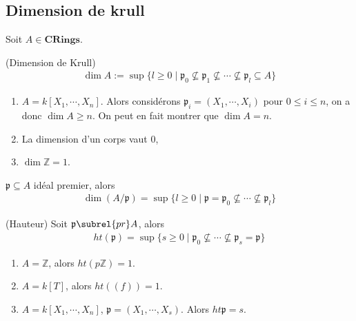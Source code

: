         \subsection{Dimension de krull}
            Soit $A \in \mathbf{CRings}$.
            \begin{defi} (Dimension de Krull)
                \begin{align*}
                    \dim A := \sup \{l \geq 0 \mid \mathfrak{p}_0 \nsubseteq \mathfrak{p}_1 \nsubseteq \cdots \nsubseteq \mathfrak{p}_l \subseteq A\}
                \end{align*}
            \end{defi}
            \begin{expl}
                \begin{enumerate}
                    \item $A = k[X_1, \cdots, X_n]$. Alors considérons $\mathfrak{p}_i = (X_1, \cdots, X_i)$ pour $0 \leq i \leq n$, on a donc $\dim A \geq n$. On peut en fait montrer que $\dim A = n$. 
                    \item La dimension d'un corps vaut $0$,
                    \item $\dim \mathbb{Z} = 1$.
                \end{enumerate}
            \end{expl}
            \begin{remq}
                $\mathfrak{p} \subseteq A$ idéal premier, alors
                \begin{align*}
                    \dim (A/\mathfrak{p}) = \sup \{l \geq 0 \mid \mathfrak{p} = \mathfrak{p}_0 \nsubseteq \cdots \nsubseteq \mathfrak{p}_l \}
                \end{align*}
            \end{remq}
            \begin{defi} (Hauteur)
                Soit $\mathfrak{p} \subrel{pr} A$, alors
                \begin{align*}
                    ht(\mathfrak{p}) = \sup \{s \geq 0 \mid \mathfrak{p}_0 \nsubseteq \cdots \nsubseteq \mathfrak{p}_s = \mathfrak{p} \}
                \end{align*}
            \end{defi}
            \begin{expl}
                \begin{enumerate}
                    \item $A = \mathbb{Z}$, alors $ht(p \mathbb{Z}) = 1$. 
                    \item $A = k[T]$, alors $ht((f)) = 1$.
                    \item $A = k[X_1, \cdots, X_n]$, $\mathfrak{p} = (X_1, \cdots, X_s)$. Alors $ht \mathfrak{p} = s$.
                \end{enumerate}
            \end{expl}
